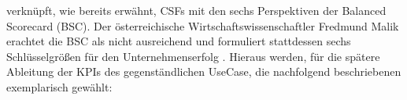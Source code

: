 
\cite{parmenter_key_2010} verknüpft, wie bereits erwähnt, CSFs mit den sechs Perspektiven der Balanced Scorecard (BSC). Der österreichische Wirtschaftswissenschaftler Fredmund Malik erachtet die BSC als nicht ausreichend und formuliert stattdessen sechs Schlüsselgrößen für den Unternehmenserfolg \citep{manager-magazin_malik-kolumne_2005}. Hieraus werden, für die spätere Ableitung der KPIs des gegenständlichen UseCase, die nachfolgend beschriebenen exemplarisch gewählt:

